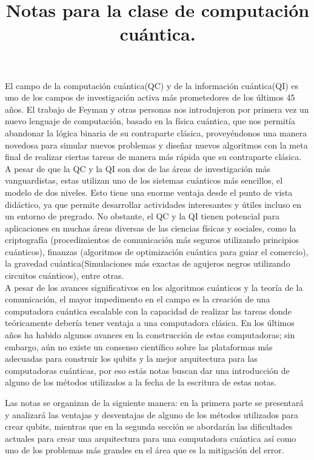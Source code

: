 \documentclass[pdflatex,sn-mathphys-num]{sn-jnl}
\theoremstyle{thmstyleone}%
\theoremstyle{thmstyletwo}%
\theoremstyle{thmstylethree}%
\begin{document}
\title[Article Title]{Notas para la clase de computación cuántica.}

\author*[1,2]{ }


\maketitle

El campo de la computación cuántica(QC) y de la información cuántica(QI) es uno de los campos de investigación activa más prometedores de los últimos 45 años. El trabajo de Feyman y otras personas nos introdujeron por primera vez un nuevo lenguaje de computación, basado en la física cuántica, que nos permitía abandonar la lógica binaria de su contraparte clásica, proveyéndonos una manera novedosa para simular nuevos problemas y diseñar nuevos algoritmos con la meta final de realizar ciertas tareas de manera más rápida que su contraparte clásica.\\

A pesar de que la QC y la QI son dos de las áreas de investigación más vanguardistas, estas utilizan uno de los sistemas cuánticos más sencillos, el modelo de dos niveles. Esto tiene una enorme ventaja desde el punto de vista didáctico, ya que permite desarrollar actividades interesantes y útiles incluso en un entorno de pregrado. No obstante, el QC y la QI tienen potencial para aplicaciones en muchas áreas diversas de las ciencias físicas y sociales, como la criptografía (procedimientos de comunicación más seguros utilizando principios cuánticos), finanzas (algoritmos de optimización cuántica para guiar el comercio), la gravedad cuántica(Simulaciones más exactas de agujeros negros utilizando circuitos cuánticos), entre otras.\\

A pesar de los avances significativos en los algoritmos cuánticos y la teoría de la comunicación, el mayor impedimento en el campo es la creación de una computadora cuántica escalable con la capacidad de realizar las tareas donde teóricamente debería tener ventaja a una computadora clásica. En los últimos años ha habido algunos avances en la construcción de estas computadoras; sin embargo, aún no existe un consenso científico sobre las plataformas más adecuadas para construir los qubits y la mejor arquitectura para las computadoras cuánticas, por eso estás notas buscan dar una introducción de alguno de los métodos utilizados a la fecha de la escritura de estas notas.

Las notas se organizan de la siguiente manera: en la primera parte se presentará y analizará las ventajas y desventajas de alguno de los métodos utilizados para crear qubits, mientras que en la segunda sección se abordarán las dificultades actuales para crear una arquitectura para una computadora cuántica así como uno de los problemas más grandes en el área que es la mitigación del error.



\newpage
\nocite{*}


\end{document}
